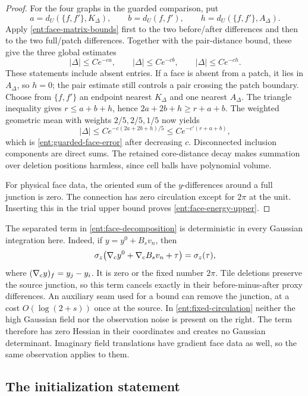 \begin{proof}
For the four graphs in the guarded comparison, put
\[
 a=d_U(\{f,f'\},K_\Delta),\qquad
 b=d_U(f,f'),\qquad h=d_U(\{f,f'\},A_\Delta).
\]
Apply \eqref{ent:face-matrix-bounds} first to the two before/after
differences and then to the two full/patch differences.  Together
with the pair-distance bound, these give the three global estimates
\[
       |\Delta|\le Ce^{-ca},\qquad
       |\Delta|\le Ce^{-cb},\qquad
       |\Delta|\le Ce^{-ch}.
\]
These statements include absent entries.  If a face is absent from
a patch, it lies in \(A_\Delta\), so \(h=0\); the pair estimate
still controls a pair crossing the patch boundary.  Choose from
\(\{f,f'\}\) an endpoint nearest \(K_\Delta\) and one nearest
\(A_\Delta\).  The triangle inequality gives \(r\le a+b+h\), hence
\(2a+2b+h\ge r+a+b\).  The weighted geometric mean with weights
\(2/5,2/5,1/5\) now yields
\[
 |\Delta|\le C e^{-c(2a+2b+h)/5}
          \le C e^{-c'(r+a+b)},
\]
which is \eqref{ent:guarded-face-error} after decreasing \(c\).
Disconnected inclusion components are direct sums.  The retained
core-distance decay makes summation over deletion positions
harmless, since cell balls have polynomial volume.

For physical face data, the oriented sum of the \(y\)-differences
around a full junction is zero.  The connection has zero
circulation except for \(2\pi\) at the unit.  Inserting this in
the trial upper bound proves \eqref{ent:face-energy-upper}.
\end{proof}

The separated term in \eqref{ent:face-decomposition} is
deterministic in every Gaussian integration here.  Indeed, if
\(y=y^0+B_sv_n\), then
\begin{equation}\label{ent:fixed-circulation}
 \sigma_z\bigl(\nabla_{\rm c}y^0+\nabla_{\rm c}B_sv_n+\tau\bigr)
                 =\sigma_z(\tau),
\end{equation}
where \((\nabla_{\rm c}y)_f=y_j-y_i\).  It is zero or the fixed
number \(2\pi\).  Tile deletions preserve the source junction, so
this term cancels exactly in their before-minus-after proxy
differences.  An auxiliary seam used for a bound can remove the
junction, at a cost \(O(\log(2+s))\) once at the source.  In
\eqref{ent:fixed-circulation} neither the high Gaussian field nor
the observation noise is present on the right.  The term therefore
has zero Hessian in their coordinates and creates no Gaussian
determinant.  Imaginary field translations have gradient face data
as well, so the same observation applies to them.

\subsection{The initialization statement}

